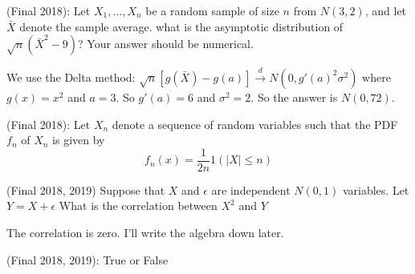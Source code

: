\documentclass[answers]{exam}
\begin{document}
\begin{questions}
\question (Final 2018): Let $X_1,...,X_n$ be a random sample of size $n$ from $N(3,2)$, and let $\bar{X}$ denote the sample average. what is the asymptotic distribution of $\sqrt{n}(\bar{X}^2-9)$? Your answer should be numerical.
\begin{solution}
    We use the Delta method: $\sqrt{n}[g(\bar{X}) - g(a)] \xrightarrow{d} N(0, g'(a)^2 \sigma^2)$ where $g(x) = x^2$ and $a = 3$. So $g'(a) = 6$ and $\sigma^2 = 2$. So the answer is $N(0, 72)$.
\end{solution}

\question (Final 2018): Let $X_n$ denote a sequence of random variables such that the PDF $f_n$ of $X_n$ is given by
$$f_n(x)=\frac{1}{2n}1(|X|\leq n)$$

\question (Final 2018, 2019) Suppose that $X$ and $\epsilon$ are independent $N(0,1)$ variables. Let $Y = X + \epsilon$ What is the correlation between $X^2$ and $Y$

\begin{solution}
    The correlation is zero. I'll write the algebra down later.
\end{solution}

\question (Final 2018, 2019): True or False
\end{questions}
\end{document}
